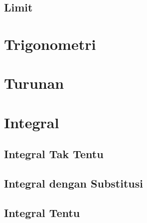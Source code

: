 \documentclass[pdflatex,compress,mathserif]{beamer}
\begin{document}
	\subsection{Limit}

\section{Trigonometri}

\section{Turunan}

\section{Integral}

	\subsection{Integral Tak Tentu}

	\subsection{Integral dengan Substitusi}
	
	\subsection{Integral Tentu}
\end{document}

